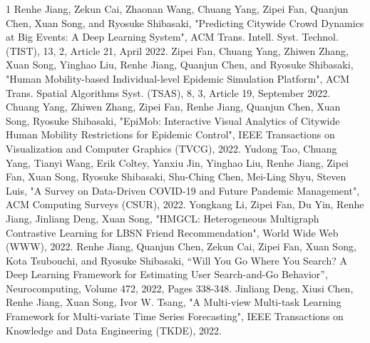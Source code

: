 \begin{雑誌論文}{1}
Renhe Jiang, Zekun Cai, Zhaonan Wang, Chuang Yang, Zipei Fan, Quanjun Chen, Xuan Song, and Ryosuke Shibasaki, "Predicting Citywide Crowd Dynamics at Big Events: A Deep Learning System", ACM Trans. Intell. Syst. Technol. (TIST), 13, 2, Article 21, April 2022.
Zipei Fan, Chuang Yang, Zhiwen Zhang, Xuan Song, Yinghao Liu, Renhe Jiang, Quanjun Chen, and Ryosuke Shibasaki, "Human Mobility-based Individual-level Epidemic Simulation Platform", ACM Trans. Spatial Algorithms Syst. (TSAS), 8, 3, Article 19, September 2022.
Chuang Yang, Zhiwen Zhang, Zipei Fan, Renhe Jiang, Quanjun Chen, Xuan Song, Ryosuke Shibasaki, "EpiMob: Interactive Visual Analytics of Citywide Human Mobility Restrictions for Epidemic Control", IEEE Transactions on Visualization and Computer Graphics (TVCG), 2022.
Yudong Tao, Chuang Yang, Tianyi Wang, Erik Coltey, Yanxiu Jin, Yinghao Liu, Renhe Jiang, Zipei Fan, Xuan Song, Ryosuke Shibasaki, Shu-Ching Chen, Mei-Ling Shyu, Steven Luis, "A Survey on Data-Driven COVID-19 and Future Pandemic Management", ACM Computing Surveys (CSUR), 2022.
Yongkang Li, Zipei Fan, Du Yin, Renhe Jiang, Jinliang Deng, Xuan Song, "HMGCL: Heterogeneous Multigraph Contrastive Learning for LBSN Friend Recommendation", World Wide Web (WWW), 2022.
Renhe Jiang, Quanjun Chen, Zekun Cai, Zipei Fan, Xuan Song, Kota Tsubouchi, and Ryosuke Shibasaki, “Will You Go Where You Search? A Deep Learning Framework for Estimating User Search-and-Go Behavior”, Neurocomputing, Volume 472, 2022, Pages 338-348.
Jinliang Deng, Xiusi Chen, Renhe Jiang, Xuan Song, Ivor W. Tsang, "A Multi-view Multi-task Learning Framework for Multi-variate Time Series Forecasting", IEEE Transactions on Knowledge and Data Engineering (TKDE), 2022.

\end{雑誌論文}

